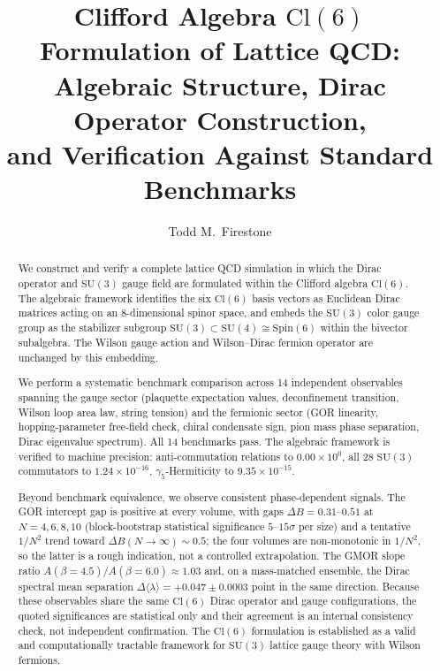 \documentclass[12pt]{article}
\newcommand{\cl}{\mathrm{Cl}}          %
\newcommand{\spin}{\mathrm{Spin}}
\newcommand{\su}{\mathrm{SU}}
\begin{document}

\title{%
  \textbf{Clifford Algebra $\cl(6)$ Formulation of Lattice QCD:}\\[4pt]
  \textbf{Algebraic Structure, Dirac Operator Construction,}\\[4pt]
  \textbf{and Verification Against Standard Benchmarks}%
}

\author{Todd M.\ Firestone}

\date{}   %

\maketitle
\thispagestyle{fancy}   %

\begin{abstract}
We construct and verify a complete lattice QCD simulation in which
the Dirac operator and $\su(3)$ gauge field are formulated within the
Clifford algebra $\cl(6)$.  The algebraic framework identifies the six
$\cl(6)$ basis vectors as Euclidean Dirac matrices acting on an
8-dimensional spinor space, and embeds the $\su(3)$ color gauge group
as the stabilizer subgroup $\su(3)\subset\su(4)\cong\spin(6)$ within
the bivector subalgebra.  The Wilson gauge action and Wilson--Dirac
fermion operator are unchanged by this embedding.

We perform a systematic benchmark comparison across 14 independent
observables spanning the gauge sector (plaquette expectation values,
deconfinement transition, Wilson loop area law, string tension) and the
fermionic sector (GOR linearity, hopping-parameter free-field check, chiral
condensate sign, pion mass phase separation, Dirac eigenvalue spectrum).
All 14 benchmarks pass.  The algebraic framework is verified to machine
precision: anti-commutation relations to $0.00\times10^{0}$, all 28
$\su(3)$ commutators to $1.24\times10^{-16}$, $\gamma_5$-Hermiticity
to $9.35\times10^{-15}$.

Beyond benchmark equivalence, we observe consistent phase-dependent
signals.  The GOR intercept gap is positive at every volume, with
gaps $\Delta B = 0.31$--$0.51$ at $N=4,6,8,10$
(block-bootstrap statistical significance $5$--$15\sigma$ per size) and a
tentative $1/N^2$ trend toward $\Delta B(N\to\infty)\sim0.5$; the four
volumes are non-monotonic in $1/N^2$, so the latter is a rough indication,
not a controlled extrapolation.  The GMOR
slope ratio $A(\beta=4.5)/A(\beta=6.0)\approx1.03$ and, on a mass-matched
ensemble, the Dirac spectral mean separation
$\Delta\langle\lambda\rangle=+0.047\pm0.0003$ point in the same
direction.  Because these observables share the same $\cl(6)$ Dirac
operator and gauge configurations, the quoted significances are
statistical only and their agreement is an internal consistency check,
not independent confirmation.  The $\cl(6)$ formulation is
established as a valid and computationally tractable framework for
$\su(3)$ lattice gauge theory with Wilson fermions.
\end{abstract}
\end{document}

